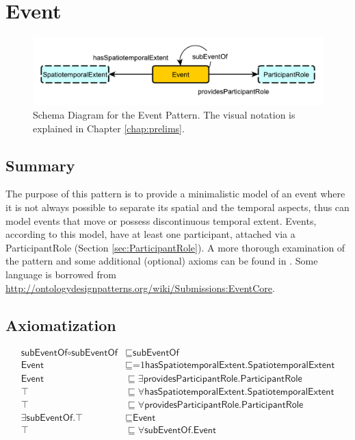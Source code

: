 \section{Event}
\label{sec:Event}
\begin{figure}[h!]
\begin{center}
\includegraphics[width=.8\textwidth]{figures/event}
\end{center}
\caption{Schema Diagram for the Event Pattern. The visual notation is explained in Chapter \ref{chap:prelims}.}
\label{fig:Event}
\end{figure}
\subsection{Summary}
\label{sum:Event}
The purpose of this pattern is to provide a minimalistic model of an event where it is not always possible to separate its spatial and the temporal aspects, thus can model events that move or possess discontinuous temporal extent. Events, according to this model, have at least one participant, attached via a \textsf{ParticipantRole} (Section \ref{sec:ParticipantRole}). A more thorough examination of the pattern and some additional (optional) axioms can be found in \cite{event}. Some language is borrowed from \url{http://ontologydesignpatterns.org/wiki/Submissions:EventCore}.

\subsection{Axiomatization}
\label{axs:Event}
\begin{align}
\textsf{subEventOf} \circ \textsf{subEventOf} &\sqsubseteq \textsf{subEventOf} \\
\textsf{Event} &\sqsubseteq \text{=1} \textsf{hasSpatiotemporalExtent.SpatiotemporalExtent} \\
\textsf{Event} &\sqsubseteq \exists \textsf{providesParticipantRole.ParticipantRole} \\
\top &\sqsubseteq \forall \textsf{hasSpatiotemporalExtent.SpatiotemporalExtent} \\
\top &\sqsubseteq \forall \textsf{providesParticipantRole.ParticipantRole} \\
\exists \textsf{subEventOf.}\top &\sqsubseteq \textsf{Event} \\
\top &\sqsubseteq \forall \textsf{subEventOf.Event}
\end{align}

